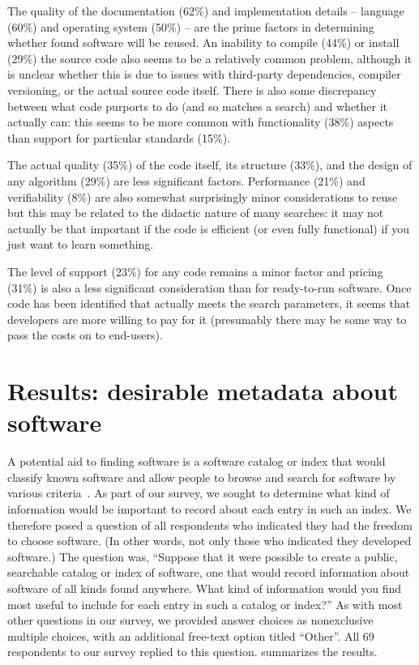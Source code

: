 \documentclass{casicswhitepaper}
\newcommand{\totalrespondents}{69\xspace}
\begin{document}
The quality of the documentation (62\%) and implementation details -- language (60\%) and operating system (50\%) -- are the prime factors in determining whether found software will be reused. An inability to compile (44\%) or install (29\%) the source code also seems to be a relatively common problem, although it is unclear whether this is due to issues with third-party dependencies, compiler versioning, or the actual source code itself. There is also some discrepancy between what code purports to do (and so matches a search) and whether it actually can: this seems to be more common with functionality (38\%) aspects than support for particular standards (15\%). 

The actual quality (35\%) of the code itself, its structure (33\%), and the design of any algorithm (29\%) are less significant factors. Performance (21\%) and verifiability (8\%) are also somewhat surprisingly minor considerations to reuse but this may be related to the didactic nature of many searches: it may not actually be that important if the code is efficient (or even fully functional) if you just want to learn something.

The level of support (23\%) for any code remains a minor factor and pricing (31\%) is also a less significant consideration than for ready-to-run software. Once code has been identified that actually meets the search parameters, it seems that developers are more willing to pay for it (presumably there may be some way to pass the costs on to end-users).


\section{Results: desirable metadata about software}

A potential aid to finding software is a software catalog or index that would classify known software and allow people to browse and search for software by various criteria~\cite{marshall2006software}.  As part of our survey, we sought to determine what kind of information would be important to record about each entry in such an index.  We therefore posed a question of all respondents who indicated they had the freedom to choose software.  (In other words, not only those who indicated they developed software.)  The question was, ``Suppose that it were possible to create a public, searchable catalog or index of software, one that would record information about software of all kinds found anywhere.  What kind of information would you find most useful to include for each entry in such a catalog or index?''  As with most other questions in our survey, we provided answer choices as nonexclusive multiple choices, with an additional free-text option titled ``Other''.  All \totalrespondents respondents to our survey replied to this question.   summarizes the results.
\end{document}
